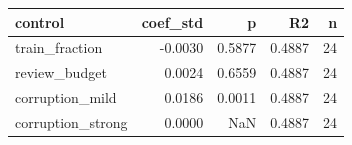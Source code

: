 \begin{tabular}{lrrrr}
\toprule
          control &  coef\_std &      p &     R2 &  n \\
\midrule
   train\_fraction &   -0.0030 & 0.5877 & 0.4887 & 24 \\
    review\_budget &    0.0024 & 0.6559 & 0.4887 & 24 \\
  corruption\_mild &    0.0186 & 0.0011 & 0.4887 & 24 \\
corruption\_strong &    0.0000 &    NaN & 0.4887 & 24 \\
\bottomrule
\end{tabular}
